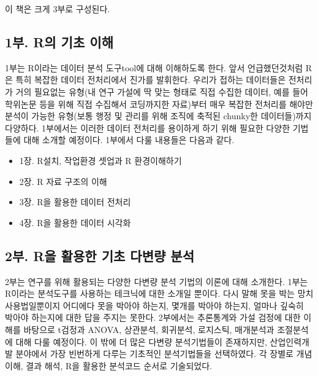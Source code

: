 \documentclass[
]{book}
\providecommand{\tightlist}{%
  \setlength{\itemsep}{0pt}\setlength{\parskip}{0pt}}
\theoremstyle{definition}
\theoremstyle{definition}
\theoremstyle{definition}
\theoremstyle{definition}
\theoremstyle{remark}
\begin{document}
이 책은 크게 3부로 구성된다.

\hypertarget{uxbd80.-ruxc758-uxae30uxcd08-uxc774uxd574}{%
\subsection*{1부. R의 기초 이해}\label{uxbd80.-ruxc758-uxae30uxcd08-uxc774uxd574}}

1부는 R이라는 데이터 분석 도구tool에 대해 이해하도록 한다. 앞서 언급했던것처럼 R은 특히 복잡한 데이터 전처리에서 진가를 발휘한다. 우리가 접하는 데이터들은 전처리가 거의 필요없는 유형(내 연구 가설에 딱 맞는 형태로 직접 수집한 데이터, 예를 들어 학위논문 등을 위해 직접 수집해서 코딩까지한 자료)부터 매우 복잡한 전처리를 해야만 분석이 가능한 유형(보통 행정 및 관리를 위해 조직에 축적된 chunky한 데이터들)까지 다양하다. 1부에서는 이러한 데이터 전처리를 용이하게 하기 위해 필요한 다양한 기법들에 대해 소개할 예정이다. 1부에서 다룰 내용들은 다음과 같다.

\begin{itemize}
\tightlist
\item
  1장. R설치, 작업환경 셋업과 R 환경이해하기
\item
  2장. R 자료 구조의 이해
\item
  3장. R을 활용한 데이터 전처리
\item
  4장. R을 활용한 데이터 시각화
\end{itemize}

\hypertarget{uxbd80.-ruxc744-uxd65cuxc6a9uxd55c-uxae30uxcd08-uxb2e4uxbcc0uxb7c9-uxbd84uxc11d}{%
\subsection*{2부. R을 활용한 기초 다변량 분석}\label{uxbd80.-ruxc744-uxd65cuxc6a9uxd55c-uxae30uxcd08-uxb2e4uxbcc0uxb7c9-uxbd84uxc11d}}

2부는 연구를 위해 활용되는 다양한 다변량 분석 기법의 이론에 대해 소개한다. 1부는 R이라는 분석도구를 사용하는 테크닉에 대한 소개일 뿐이다. 다시 말해 못을 박는 망치 사용법일뿐이지 어디에다 못을 박아야 하는지, 몇개를 박아야 하는지, 얼마나 깊숙히 박아야 하는지에 대한 답을 주지는 못한다. 2부에서는 추론통계와 가설 검정에 대한 이해를 바탕으로 t검정과 ANOVA, 상관분석, 회귀분석, 로지스틱, 매개분석과 조절분석에 대해 다룰 예정이다. 이 밖에 더 많은 다변량 분석기법들이 존재하지만, 산업인력개발 분야에서 가장 빈번하게 다루는 기초적인 분석기법들을 선택하였다. 각 장별로 개념이해, 결과 해석, R을 활용한 분석코드 순서로 기술되었다.
\end{document}

